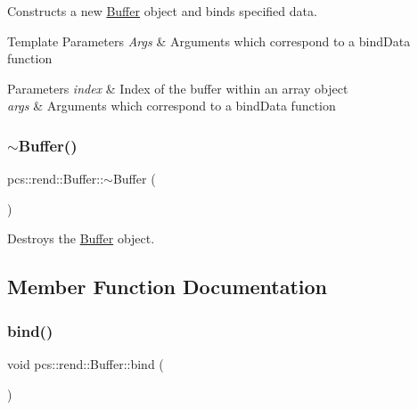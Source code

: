 Constructs a new \hyperlink{classpcs_1_1rend_1_1Buffer}{Buffer} object and binds specified data. 


\begin{DoxyTemplParams}{Template Parameters}
{\em Args} & Arguments which correspond to a bind\+Data function \\
\hline
\end{DoxyTemplParams}

\begin{DoxyParams}{Parameters}
{\em index} & Index of the buffer within an array object \\
\hline
{\em args} & Arguments which correspond to a bind\+Data function \\
\hline
\end{DoxyParams}
\mbox{\label{classpcs_1_1rend_1_1Buffer_a38bfdd852e494d21e430b2a0007021d4}} 
\subsubsection{\texorpdfstring{$\sim$\+Buffer()}{~Buffer()}}
{\footnotesize\ttfamily pcs\+::rend\+::\+Buffer\+::$\sim$\+Buffer (\begin{DoxyParamCaption}{ }\end{DoxyParamCaption})}



Destroys the \hyperlink{classpcs_1_1rend_1_1Buffer}{Buffer} object. 



\subsection{Member Function Documentation}
\mbox{\label{classpcs_1_1rend_1_1Buffer_a1be9c6c19cee147e580c8d1038a664a9}} 
\subsubsection{\texorpdfstring{bind()}{bind()}}
{\footnotesize\ttfamily void pcs\+::rend\+::\+Buffer\+::bind (\begin{DoxyParamCaption}{ }\end{DoxyParamCaption})}



